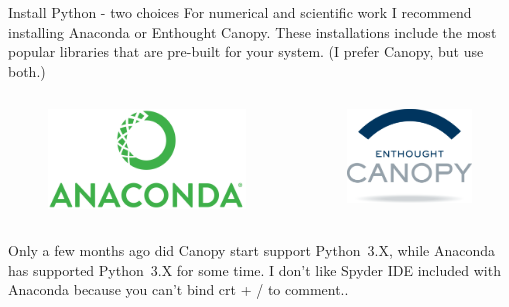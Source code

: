 \documentclass[10pt]{beamer}
\begin{document}
\begin{frame}{Install Python - two choices}
For numerical and scientific work I recommend installing Anaconda or Enthought Canopy. These installations include the most popular libraries that are pre-built for your system. (I prefer Canopy, but use both.)
  \begin{columns}[onlytextwidth]
          \begin{figure} 	
 	\includegraphics[width=1.0\textwidth]{figs/anaconda_logo.png}

      \end{figure}
          \begin{figure} 	
 	\includegraphics[width=1.0\textwidth]{figs/canopy-logo.png}

      \end{figure}
  \end{columns}
  
 Only a few months ago did Canopy start support Python~3.X, while Anaconda has supported Python~3.X for some time. I don't like Spyder IDE included with Anaconda because you can't bind crt + / to comment..
\end{frame}
\end{document}
